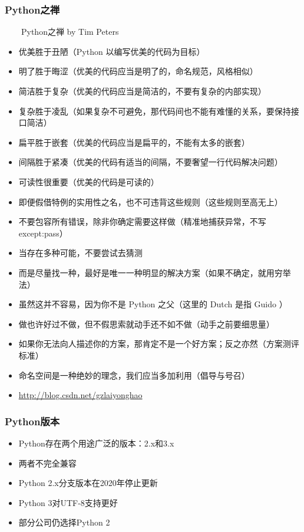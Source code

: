 \documentclass{beamer}
\begin{document}
\begin{frame}
  \frametitle{Python之禅}
	\scriptsize
	\begin{block}
		　　{Python之禅 by Tim Peters}
		\begin{itemize}
\item    优美胜于丑陋（Python 以编写优美的代码为目标）
\item    明了胜于晦涩（优美的代码应当是明了的，命名规范，风格相似）
\item    简洁胜于复杂（优美的代码应当是简洁的，不要有复杂的内部实现）
\item    复杂胜于凌乱（如果复杂不可避免，那代码间也不能有难懂的关系，要保持接口简洁）
\item    扁平胜于嵌套（优美的代码应当是扁平的，不能有太多的嵌套）
\item    间隔胜于紧凑（优美的代码有适当的间隔，不要奢望一行代码解决问题）
\item    可读性很重要（优美的代码是可读的）
\item    即便假借特例的实用性之名，也不可违背这些规则（这些规则至高无上）
\item    不要包容所有错误，除非你确定需要这样做（精准地捕获异常，不写 except:pass）
\item    当存在多种可能，不要尝试去猜测
\item    而是尽量找一种，最好是唯一一种明显的解决方案（如果不确定，就用穷举法）
\item    虽然这并不容易，因为你不是 Python 之父（这里的 Dutch 是指 Guido ）
\item    做也许好过不做，但不假思索就动手还不如不做（动手之前要细思量）
\item    如果你无法向人描述你的方案，那肯定不是一个好方案；反之亦然（方案测评标准）
\item    命名空间是一种绝妙的理念，我们应当多加利用（倡导与号召）
\item \url{http://blog.csdn.net/gzlaiyonghao}
		\end{itemize}
		
	\end{block}

\end{frame}
\begin{frame}
	\frametitle{Python版本}
	\begin{itemize}
		\item Python存在两个用途广泛的版本：2.x和3.x
		\item 两者不完全兼容
		\item Python 2.x分支版本在2020年停止更新
		\item Python 3对UTF-8支持更好
		\item 部分公司仍选择Python 2
	\end{itemize}
\end{frame}
\end{document}
